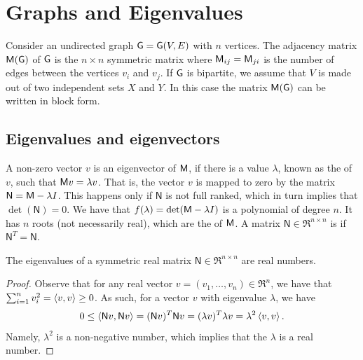 
%





\ChapterPrefix{}
\ChapterGen{}



\section{Graphs and Eigenvalues}

Consider an undirected graph $\mathsf{G} = \mathsf{G}(V,E)$ with $n$
vertices. The adjacency matrix $\mathsf{M}(\mathsf{G})$ of $\mathsf{G}$ is the $n\times
n$ symmetric matrix where $\mathsf{M}_{ij} = \mathsf{M}_{ji}$ is the number of
edges between the vertices $v_i$ and $v_j$. If $\mathsf{G}$ is bipartite,
we assume that $V$ is made out of two independent sets $X$ and $Y$. In
this case the matrix $\mathsf{M}(\mathsf{G})$ can be written in block form.

\newcommand{\MA}{\mathsf{N}}%
\subsection{Eigenvalues and eigenvectors}

A non-zero vector $v$ is an eigenvector of $\mathsf{M}$, if there is a
value $\lambda$, known as the  of $v$, such that
$\mathsf{M} v = \lambda v$. That is, the vector $v$ is mapped to zero by
the matrix $\MA = \Mtrx - \lambda I$. This happens only if $\MA$ is
not full ranked, which in turn implies that $\det(\MA)=0$. We have
that $f(\lambda ) =\det(\mathsf{M} - \lambda I)$ is a polynomial of degree
$n$. It has $n$ roots (not necessarily real), which are the
 of $\mathsf{M}$. A matrix $\MA \in \Re^{n\times n}$ is
 if $\MA^T = \MA$.

\begin{lemma}
    The eigenvalues of a symmetric real matrix $\MA \in \Re^{n \times
       n}$ are real numbers.
\end{lemma}
\begin{proof}
    Observe that for any real vector $v=(v_1, \ldots, v_n) \in \Re^n$,
    we have that $\sum_{i=1}^n v_i^2 = \left\langle {{v},{v}} \right\rangle \geq 0$. As
    such, for a vector $v$ with eigenvalue $\lambda$, we have
    \begin{equation*}
        0 \leq 
        \DotProd{ \MA v}{\MA v} = (\MA v)^T \MA v
        = (\lambda v)^T \lambda v
        = \lambda^2 \DotProd{v}{v}.
    \end{equation*}
    Namely, $\lambda^2$ is a non-negative number, which implies that
    the $\lambda$ is a real number.
\end{proof}

